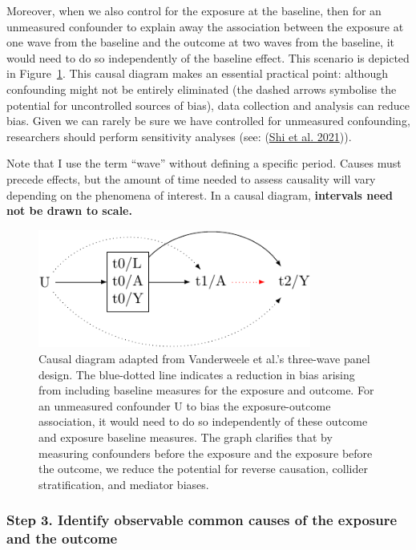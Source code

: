 \documentclass[
  singlecolumn]{article}
\begin{document}
Moreover, when we also control for the exposure at the baseline, then
for an unmeasured confounder to explain away the association between the
exposure at one wave from the baseline and the outcome at two waves from
the baseline, it would need to do so independently of the baseline
effect. This scenario is depicted in Figure~\ref{fig-dag-6}. This causal
diagram makes an essential practical point: although confounding might
not be entirely eliminated (the dashed arrows symbolise the potential
for uncontrolled sources of bias), data collection and analysis can
reduce bias. Given we can rarely be sure we have controlled for
unmeasured confounding, researchers should perform sensitivity analyses
(see: (\protect\hyperlink{ref-shi2021}{Shi et al. 2021})).

Note that I use the term ``wave'' without defining a specific period.
Causes must precede effects, but the amount of time needed to assess
causality will vary depending on the phenomena of interest. In a causal
diagram, \textbf{intervals need not be drawn to scale.}

\begin{figure}

{\centering \includegraphics[width=0.8\textwidth,height=\textheight]{causal-dags_files/figure-pdf/fig-dag-6-1.pdf}

}

\caption{\label{fig-dag-6}Causal diagram adapted from Vanderweele et
al.'s three-wave panel design. The blue-dotted line indicates a
reduction in bias arising from including baseline measures for the
exposure and outcome. For an unmeasured confounder U to bias the
exposure-outcome association, it would need to do so independently of
these outcome and exposure baseline measures. The graph clarifies that
by measuring confounders before the exposure and the exposure before the
outcome, we reduce the potential for reverse causation, collider
stratification, and mediator biases.}

\end{figure}

\hypertarget{step-3.-identify-observable-common-causes-of-the-exposure-and-the-outcome}{%
\subsubsection{Step 3. Identify observable common causes of the exposure
and the
outcome}\label{step-3.-identify-observable-common-causes-of-the-exposure-and-the-outcome}}
\end{document}
